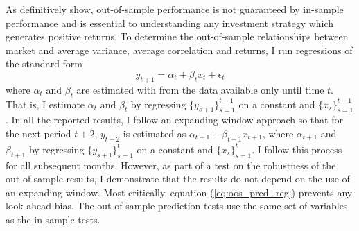 As \citet{Welch2008} definitively show, out-of-sample performance is not guaranteed by in-sample performance and is essential to understanding any investment strategy which generates positive returns. To determine the out-of-sample relationships between market and average variance, average correlation and returns, I run regressions of the standard form
\begin{equation}
	\label{eq:oos_pred_reg}
	y_{t+1} = \alpha_{t} + \beta_{t}x_{t} + \epsilon_{t}
\end{equation}
where $\alpha_{t}$ and $\beta_{t}$ are estimated with from the data available only until time $t$. That is, I estimate
$\alpha_{t}$ and $ \beta_{t}$ by regressing $\{y_{s+1}\}_{s=1}^{t-1}$ on a constant and $\{x_{s}\}_{s=1}^{t-1}$. In all the reported results, I follow an expanding window approach so that for the next period $t+2$, $ y_{t+2}$ is estimated as $\alpha_{t+1} +  \beta_{t+1}x_{t+1}$, where $\alpha_{t+1}$ and $ \beta_{t+1}$ by regressing $\{y_{s+1}\}_{s=1}^{t}$ on a constant and $\{x_{s}\}_{s=1}^{t}$. I follow this process for all subsequent months. However, as part of a test on the robustness of the out-of-sample results, I demonstrate that the results do not depend on the use of an expanding window. Most critically, equation (\ref{eq:oos_pred_reg}) prevents any look-ahead bias. The out-of-sample prediction tests use the same set of variables as the in sample tests. 

